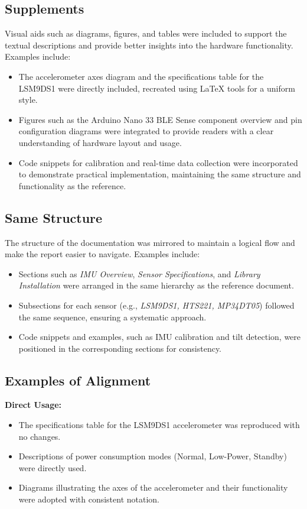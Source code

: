 \subsection{Supplements}
Visual aids such as diagrams, figures, and tables were included to support the textual descriptions and provide better insights into the hardware functionality. Examples include:
\begin{itemize}
	\item The accelerometer axes diagram and the specifications table for the LSM9DS1 were directly included, recreated using LaTeX tools for a uniform style.
	\item Figures such as the Arduino Nano 33 BLE Sense component overview and pin configuration diagrams were integrated to provide readers with a clear understanding of hardware layout and usage.
	\item Code snippets for calibration and real-time data collection were incorporated to demonstrate practical implementation, maintaining the same structure and functionality as the reference.
\end{itemize}

\subsection{Same Structure}
The structure of the documentation was mirrored to maintain a logical flow and make the report easier to navigate. Examples include:
\begin{itemize}
	\item Sections such as \textit{IMU Overview}, \textit{Sensor Specifications}, and \textit{Library Installation} were arranged in the same hierarchy as the reference document.
	\item Subsections for each sensor (e.g., \textit{LSM9DS1, HTS221, MP34DT05}) followed the same sequence, ensuring a systematic approach.
	\item Code snippets and examples, such as IMU calibration and tilt detection, were positioned in the corresponding sections for consistency.
\end{itemize}

\subsection*{Examples of Alignment}

\textbf{Direct Usage:}
\begin{itemize}
	\item The specifications table for the LSM9DS1 accelerometer was reproduced with no changes.
	\item Descriptions of power consumption modes (Normal, Low-Power, Standby) were directly used.
	\item Diagrams illustrating the axes of the accelerometer and their functionality were adopted with consistent notation.
\end{itemize}

